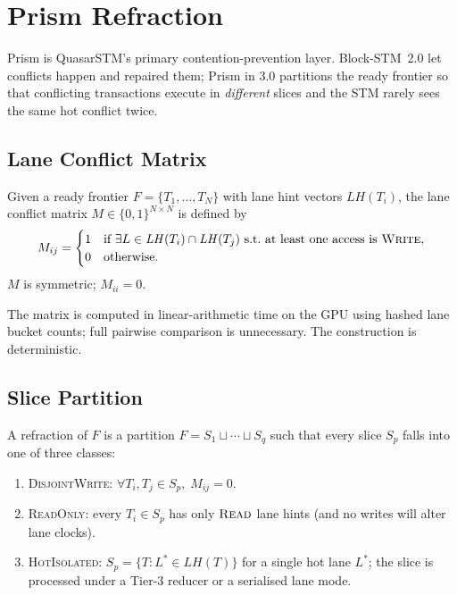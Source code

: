 \section{Prism Refraction}

\label{sec:prism}

Prism is QuasarSTM's primary contention-prevention layer. Block-STM~2.0
let conflicts happen and repaired them; Prism in 3.0 partitions the
ready frontier so that conflicting transactions execute in
\emph{different} slices and the STM rarely sees the same hot conflict
twice.

\subsection{Lane Conflict Matrix}

\begin{definition}
\label{def:lane-conflict}
Given a ready frontier $F = \{T_1, \ldots, T_N\}$ with lane hint
vectors $\mathit{LH}(T_i)$, the lane conflict matrix
$M \in \{0,1\}^{N \times N}$ is defined by
\[
M_{ij} =
\begin{cases}
1 & \text{if } \exists L \in \mathit{LH}(T_i) \cap \mathit{LH}(T_j)
      \text{ s.t.\ at least one access is } \textsc{Write}, \\
0 & \text{otherwise.}
\end{cases}
\]
$M$ is symmetric; $M_{ii} = 0$.
\end{definition}

The matrix is computed in linear-arithmetic time on the GPU using
hashed lane bucket counts; full pairwise comparison is unnecessary.
The construction is deterministic.

\subsection{Slice Partition}

\begin{definition}
\label{def:refraction}
A refraction of $F$ is a partition
$F = S_1 \sqcup \cdots \sqcup S_q$ such that every slice $S_p$ falls
into one of three classes:
\begin{enumerate}[leftmargin=2em,nosep]
\item \textsc{DisjointWrite}: $\forall T_i, T_j \in S_p,\;
      M_{ij} = 0$.
\item \textsc{ReadOnly}: every $T_i \in S_p$ has only $\textsc{Read}$
      lane hints (and no writes will alter lane clocks).
\item \textsc{HotIsolated}: $S_p = \{T : L^* \in \mathit{LH}(T)\}$ for
      a single hot lane $L^*$; the slice is processed under a Tier-3
      reducer or a serialised lane mode.
\end{enumerate}
\end{definition}

